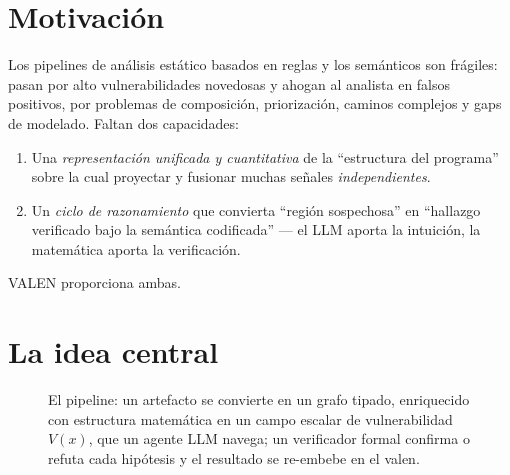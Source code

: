 \documentclass[11pt]{article}
\begin{document}
\section{Motivación}
Los pipelines de análisis estático basados en reglas y los semánticos son
frágiles: pasan por alto vulnerabilidades novedosas y ahogan al analista en
falsos positivos, por problemas de composición, priorización, caminos complejos
y gaps de modelado. Faltan dos capacidades:
\begin{enumerate}[label=(\arabic*)]
  \item Una \emph{representación unificada y cuantitativa} de la ``estructura del
        programa'' sobre la cual proyectar y fusionar muchas señales
        \emph{independientes}.
  \item Un \emph{ciclo de razonamiento} que convierta ``región sospechosa'' en
        ``hallazgo verificado bajo la semántica codificada'' --- el LLM aporta la
        intuición, la matemática aporta la verificación.
\end{enumerate}
VALEN proporciona ambas.

\section{La idea central}
\begin{figure}[h]
\centering
{}
\caption{El pipeline: un artefacto se convierte en un grafo tipado, enriquecido
con estructura matemática en un campo escalar de vulnerabilidad $V(x)$, que un
agente LLM navega; un verificador formal confirma o refuta cada hipótesis y el
resultado se re-embebe en el valen.}
\end{figure}
\end{document}
